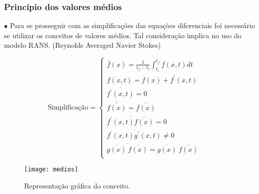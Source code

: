 \documentclass[xcolor=dvipsnames,10pt,aspectratio=169]{beamer}
\begin{document}
		\begin{frame}
			\frametitle{Princípio dos valores médios}
			$\bullet$ Para se prosseguir com as simplificações das equações diferenciais foi necessário se utilizar os conceitos de valores médios. Tal consideração implica no uso do modelo RANS. (Reynolds Averaged Navier Stokes)
			\\
			\begin{minipage}[h!]{0.45\textwidth}
				\begin{equation*}
				\label{ola}
				\text{Simplificação}=
				\begin{cases}
				\overline{f}({x})=\frac{1}{t_f - t_i} \int_{t_i}^{t_f} f({x} , t) dt      & \quad  \\
				f({x} , t) = \overline{f}({x}) + f^\prime ({x} ,t)  & \quad   \\
				\overline{f^\prime ({x} ,t)} = 0  & \quad   \\
				\overline{\overline{f({x})}} = \overline{f({x})}  & \quad   \\
				\overline{f^\prime ({x} ,t)\overline{f({x})}} = 0  & \quad   \\
				\overline{f^\prime ({x} ,t)g^\prime ({x} ,t)} \neq 0  & \quad   \\
				\overline{  \overline{g({x})} \ \overline{f({x})}  } = {\overline{g({x})}} \ {\overline{f({x})}}  & \quad   \\
				\end{cases}
				\end{equation*}
			\end{minipage}\hfill
			\begin{minipage}[h!]{0.45\textwidth}
				\begin{figure}
					\centering
					\texttt{[image: medios]}
					\caption{Representação gráfica do conceito.}
					\label{medios}
				\end{figure}
			\end{minipage}
	     	\\
		\end{frame}
	
	
	
	
	
\end{document}
